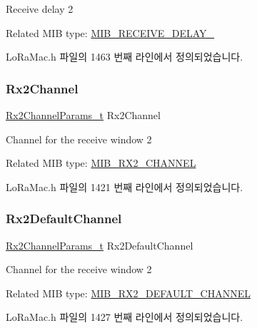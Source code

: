 Receive delay 2

Related M\+IB type\+: \mbox{\hyperlink{group___l_o_r_a_m_a_c_gga32ea83d13a3f5bb4b3ec2ace2319ab61a3d147bf887f0d7317cb2930335857000}{M\+I\+B\+\_\+\+R\+E\+C\+E\+I\+V\+E\+\_\+\+D\+E\+L\+A\+Y\+\_}} 

Lo\+Ra\+Mac.\+h 파일의 1463 번째 라인에서 정의되었습니다.

\mbox{\label{unionu_mib_param_aa0fbe93ff398020c65d2431af19368e8}} 
\subsubsection{\texorpdfstring{Rx2\+Channel}{Rx2Channel}}
{\footnotesize\ttfamily \mbox{\hyperlink{group___l_o_r_a_m_a_c_ga8f57f29481ea92c24f6af04b96a95e0f}{Rx2\+Channel\+Params\+\_\+t}} Rx2\+Channel}

Channel for the receive window 2

Related M\+IB type\+: \mbox{\hyperlink{group___l_o_r_a_m_a_c_gga32ea83d13a3f5bb4b3ec2ace2319ab61a60fe29749b57c7a5315e9c1475269ba3}{M\+I\+B\+\_\+\+R\+X2\+\_\+\+C\+H\+A\+N\+N\+EL}} 

Lo\+Ra\+Mac.\+h 파일의 1421 번째 라인에서 정의되었습니다.

\mbox{\label{unionu_mib_param_a0fc23f09c886e3ce57ed0bd2061b336a}} 
\subsubsection{\texorpdfstring{Rx2\+Default\+Channel}{Rx2DefaultChannel}}
{\footnotesize\ttfamily \mbox{\hyperlink{group___l_o_r_a_m_a_c_ga8f57f29481ea92c24f6af04b96a95e0f}{Rx2\+Channel\+Params\+\_\+t}} Rx2\+Default\+Channel}

Channel for the receive window 2

Related M\+IB type\+: \mbox{\hyperlink{group___l_o_r_a_m_a_c_gga32ea83d13a3f5bb4b3ec2ace2319ab61ac3a212e314ab58f78007ce812187179d}{M\+I\+B\+\_\+\+R\+X2\+\_\+\+D\+E\+F\+A\+U\+L\+T\+\_\+\+C\+H\+A\+N\+N\+EL}} 

Lo\+Ra\+Mac.\+h 파일의 1427 번째 라인에서 정의되었습니다.

